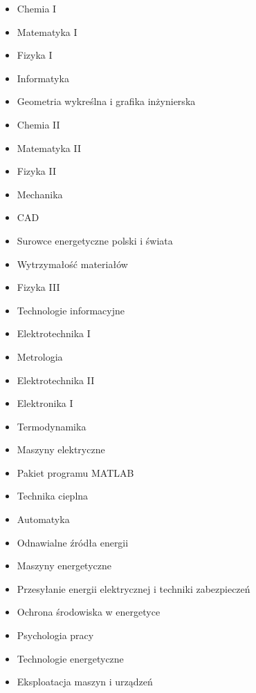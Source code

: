 \documentclass[a4paper,12pt]{article}
\begin{document}
\begin{multicols}{2}
\begin{itemize}
\item Chemia I
\item Matematyka I
\item Fizyka I
\item Informatyka
\item Geometria wykreślna i grafika inżynierska
\item Chemia II
\item Matematyka II
\item Fizyka II
\item Mechanika
\item CAD
\item Surowce energetyczne polski i świata
\item Wytrzymałość materiałów
\item Fizyka III
\item Technologie informacyjne
\item Elektrotechnika I
\item Metrologia
\item Elektrotechnika II
\item Elektronika I
\item Termodynamika
\item Maszyny elektryczne
\item Pakiet programu MATLAB
\item Technika cieplna
\item Automatyka
\item Odnawialne źródła energii
\item Maszyny energetyczne
\item Przesyłanie energii elektrycznej i techniki zabezpieczeń
\item Ochrona środowiska w energetyce
\item Psychologia pracy
\item Technologie energetyczne
\item Eksploatacja maszyn i urządzeń
\end{itemize}
\end{multicols}
\end{document}

